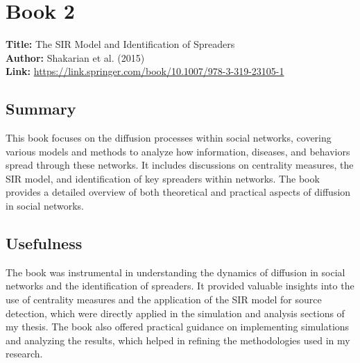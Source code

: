 \section{Book 2}
\textbf{Title:} The SIR Model and Identification of Spreaders \\
\textbf{Author:} Shakarian et al. (2015) \\
\textbf{Link:} \url{https://link.springer.com/book/10.1007/978-3-319-23105-1}

\subsection{Summary}

This book focuses on the diffusion processes within social networks, covering various models and methods to analyze how information, diseases, and behaviors spread through these networks. It includes discussions on centrality measures, the SIR model, and identification of key spreaders within networks. The book provides a detailed overview of both theoretical and practical aspects of diffusion in social networks.

\subsection{Usefulness}

The book was instrumental in understanding the dynamics of diffusion in social networks and the identification of spreaders. It provided valuable insights into the use of centrality measures and the application of the SIR model for source detection, which were directly applied in the simulation and analysis sections of my thesis. The book also offered practical guidance on implementing simulations and analyzing the results, which helped in refining the methodologies used in my research.
